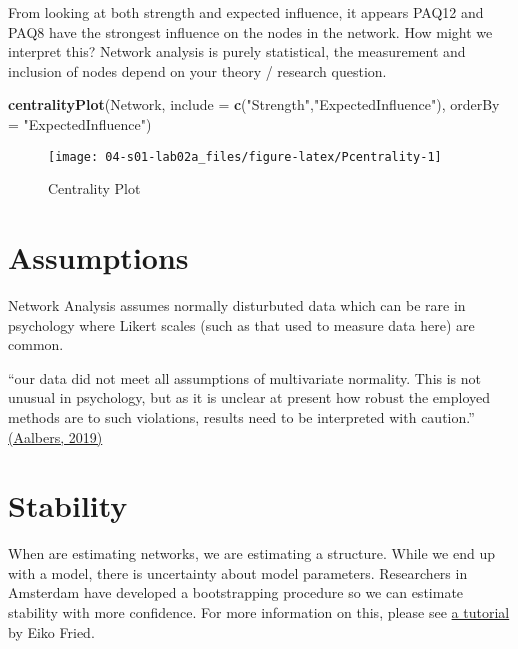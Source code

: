 \documentclass[]{book}
\newenvironment{Shaded}{\begin{snugshade}}{\end{snugshade}}
\newcommand{\DataTypeTok}[1]{\textcolor[rgb]{0.13,0.29,0.53}{#1}}
\newcommand{\KeywordTok}[1]{\textcolor[rgb]{0.13,0.29,0.53}{\textbf{#1}}}
\newcommand{\NormalTok}[1]{#1}
\newcommand{\StringTok}[1]{\textcolor[rgb]{0.31,0.60,0.02}{#1}}
\begin{document}
From looking at both strength and expected influence, it appears PAQ12 and PAQ8 have the strongest influence on the nodes in the network. How might we interpret this? Network analysis is purely statistical, the measurement and inclusion of nodes depend on your theory / research question.

\begin{Shaded}
\begin{Highlighting}[]
\KeywordTok{centralityPlot}\NormalTok{(Network, }\DataTypeTok{include =} \KeywordTok{c}\NormalTok{(}\StringTok{"Strength"}\NormalTok{,}\StringTok{"ExpectedInfluence"}\NormalTok{),}
               \DataTypeTok{orderBy =} \StringTok{"ExpectedInfluence"}\NormalTok{)}
\end{Highlighting}
\end{Shaded}

\begin{figure}

{\centering \texttt{[image: 04-s01-lab02a\_files/figure-latex/Pcentrality-1]} 

}

\caption{Centrality Plot}\label{fig:Pcentrality}
\end{figure}

\hypertarget{assumptions}{%
\section{Assumptions}\label{assumptions}}

Network Analysis assumes normally disturbuted data which can be rare in psychology where Likert scales (such as that used to measure data here) are common.

``our data did not meet all assumptions of multivariate normality. This is not unusual in psychology, but as it is unclear at present how robust the employed methods are to such violations, results need to be interpreted with caution.'' \href{https://openaccess.leidenuniv.nl/bitstream/handle/1887/73951/Aalbers_et_al_2018_T.pdf?sequence=1}{(Aalbers, 2019)}

\hypertarget{stability}{%
\section{Stability}\label{stability}}

When are estimating networks, we are estimating a structure. While we end up with a model, there is uncertainty about model parameters. Researchers in Amsterdam have developed a bootstrapping procedure so we can estimate stability with more confidence. For more information on this, please see \href{https://psych-networks.com/r-tutorial-power-issues-robustness-network-models/}{a tutorial} by Eiko Fried.
\end{document}

